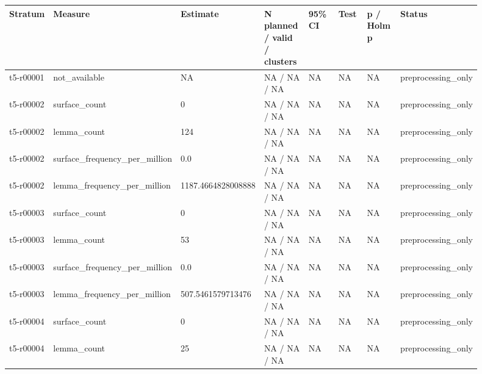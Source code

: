 \begingroup
\small
\setlength{\tabcolsep}{2pt}
\begin{longtable}{@{}p{0.09\linewidth}p{0.14\linewidth}p{0.08\linewidth}p{0.14\linewidth}p{0.14\linewidth}p{0.1\linewidth}p{0.1\linewidth}p{0.11\linewidth}@{}}
\hline
Stratum & Measure & Estimate & N planned / valid / clusters & 95\% CI & Test & p / Holm p & Status \\
\hline
t5-r00001 & not\_\allowbreak{}available & NA & NA / NA / NA & NA & NA & NA & preprocessing\_\allowbreak{}only \\
t5-r00002 & surface\_\allowbreak{}count & 0 & NA / NA / NA & NA & NA & NA & preprocessing\_\allowbreak{}only \\
t5-r00002 & lemma\_\allowbreak{}count & 124 & NA / NA / NA & NA & NA & NA & preprocessing\_\allowbreak{}only \\
t5-r00002 & surface\_\allowbreak{}frequency\_\allowbreak{}per\_\allowbreak{}million & 0.0 & NA / NA / NA & NA & NA & NA & preprocessing\_\allowbreak{}only \\
t5-r00002 & lemma\_\allowbreak{}frequency\_\allowbreak{}per\_\allowbreak{}million & 1187.4664828008888 & NA / NA / NA & NA & NA & NA & preprocessing\_\allowbreak{}only \\
t5-r00003 & surface\_\allowbreak{}count & 0 & NA / NA / NA & NA & NA & NA & preprocessing\_\allowbreak{}only \\
t5-r00003 & lemma\_\allowbreak{}count & 53 & NA / NA / NA & NA & NA & NA & preprocessing\_\allowbreak{}only \\
t5-r00003 & surface\_\allowbreak{}frequency\_\allowbreak{}per\_\allowbreak{}million & 0.0 & NA / NA / NA & NA & NA & NA & preprocessing\_\allowbreak{}only \\
t5-r00003 & lemma\_\allowbreak{}frequency\_\allowbreak{}per\_\allowbreak{}million & 507.5461579713476 & NA / NA / NA & NA & NA & NA & preprocessing\_\allowbreak{}only \\
t5-r00004 & surface\_\allowbreak{}count & 0 & NA / NA / NA & NA & NA & NA & preprocessing\_\allowbreak{}only \\
t5-r00004 & lemma\_\allowbreak{}count & 25 & NA / NA / NA & NA & NA & NA & preprocessing\_\allowbreak{}only \\

\end{longtable}
